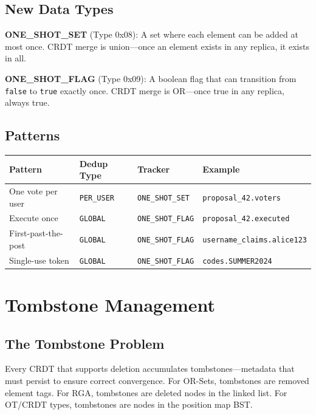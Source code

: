 \documentclass[11pt,a4paper]{article}
\begin{document}
\subsection{New Data Types}

\textbf{ONE\_SHOT\_SET} (Type 0x08): A set where each element can be added at most once. CRDT merge is union---once an element exists in any replica, it exists in all.

\textbf{ONE\_SHOT\_FLAG} (Type 0x09): A boolean flag that can transition from \texttt{false} to \texttt{true} exactly once. CRDT merge is OR---once true in any replica, always true.

\subsection{Patterns}

\vspace{4pt}
\begin{tabularx}{\textwidth}{ll>{\hsize=0.8\hsize}X>{\hsize=1.2\hsize}X}
\toprule
\textbf{Pattern} & \textbf{Dedup Type} & \textbf{Tracker} & \textbf{Example} \\
\midrule
One vote per user & \texttt{PER\_USER} & \texttt{ONE\_SHOT\_SET} & \texttt{proposal\_42.voters} \\
Execute once & \texttt{GLOBAL} & \texttt{ONE\_SHOT\_FLAG} & \texttt{proposal\_42.executed} \\
First-past-the-post & \texttt{GLOBAL} & \texttt{ONE\_SHOT\_FLAG} & \texttt{username\_claims.alice123} \\
Single-use token & \texttt{GLOBAL} & \texttt{ONE\_SHOT\_FLAG} & \texttt{codes.SUMMER2024} \\
\bottomrule
\end{tabularx}

\section{Tombstone Management}

\subsection{The Tombstone Problem}

Every CRDT that supports deletion accumulates tombstones---metadata that must persist to ensure correct convergence. For OR-Sets, tombstones are removed element tags. For RGA, tombstones are deleted nodes in the linked list. For OT/CRDT types, tombstones are nodes in the position map BST.
\end{document}
